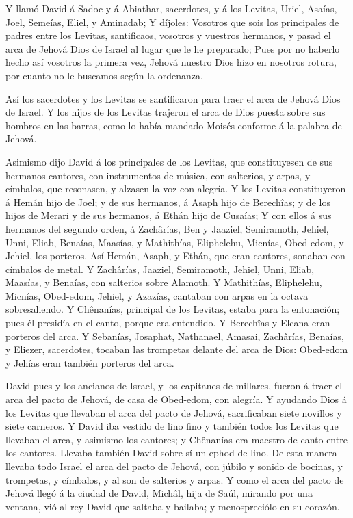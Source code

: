  Y llamó David á Sadoc y á Abiathar, sacerdotes, y á los
Levitas, Uriel, Asaías, Joel, Semeías, Eliel, y Aminadab; 
Y díjoles: Vosotros que sois los principales de padres entre los
Levitas, santificaos, vosotros y vuestros hermanos, y pasad el arca de
Jehová Dios de Israel al lugar que le he preparado;  Pues
por no haberlo hecho así vosotros la primera vez, Jehová nuestro Dios
hizo en nosotros rotura, por cuanto no le buscamos según la ordenanza.

 Así los sacerdotes y los Levitas se santificaron para
traer el arca de Jehová Dios de Israel.  Y los hijos de los
Levitas trajeron el arca de Dios puesta sobre sus hombros en las barras,
como lo había mandado Moisés conforme á la palabra de Jehová.

 Asimismo dijo David á los principales de los Levitas, que
constituyesen de sus hermanos cantores, con instrumentos de música, con
salterios, y arpas, y címbalos, que resonasen, y alzasen la voz con
alegría.  Y los Levitas constituyeron á Hemán hijo de Joel;
y de sus hermanos, á Asaph hijo de Berechîas; y de los hijos de Merari y
de sus hermanos, á Ethán hijo de Cusaías;  Y con ellos á
sus hermanos del segundo orden, á Zachârías, Ben y Jaaziel, Semiramoth,
Jehiel, Unni, Eliab, Benaías, Maasías, y Mathithías, Eliphelehu,
Micnías, Obed-edom, y Jehiel, los porteros.  Así Hemán,
Asaph, y Ethán, que eran cantores, sonaban con címbalos de metal.
 Y Zachârías, Jaaziel, Semiramoth, Jehiel, Unni, Eliab,
Maasías, y Benaías, con salterios sobre Alamoth.  Y
Mathithías, Eliphelehu, Micnías, Obed-edom, Jehiel, y Azazías, cantaban
con arpas en la octava sobresaliendo.  Y Chênanías,
principal de los Levitas, estaba para la entonación; pues él presidía en
el canto, porque era entendido.  Y Berechîas y Elcana eran
porteros del arca.  Y Sebanías, Josaphat, Nathanael,
Amasai, Zachârías, Benaías, y Eliezer, sacerdotes, tocaban las trompetas
delante del arca de Dios: Obed-edom y Jehías eran también porteros del
arca.

 David pues y los ancianos de Israel, y los capitanes de
millares, fueron á traer el arca del pacto de Jehová, de casa de
Obed-edom, con alegría.  Y ayudando Dios á los Levitas que
llevaban el arca del pacto de Jehová, sacrificaban siete novillos y
siete carneros.  Y David iba vestido de lino fino y también
todos los Levitas que llevaban el arca, y asimismo los cantores; y
Chênanías era maestro de canto entre los cantores. Llevaba también David
sobre sí un ephod de lino.  De esta manera llevaba todo
Israel el arca del pacto de Jehová, con júbilo y sonido de bocinas, y
trompetas, y címbalos, y al son de salterios y arpas.  Y
como el arca del pacto de Jehová llegó á la ciudad de David, Michâl,
hija de Saúl, mirando por una ventana, vió al rey David que saltaba y
bailaba; y menospreciólo en su corazón.

